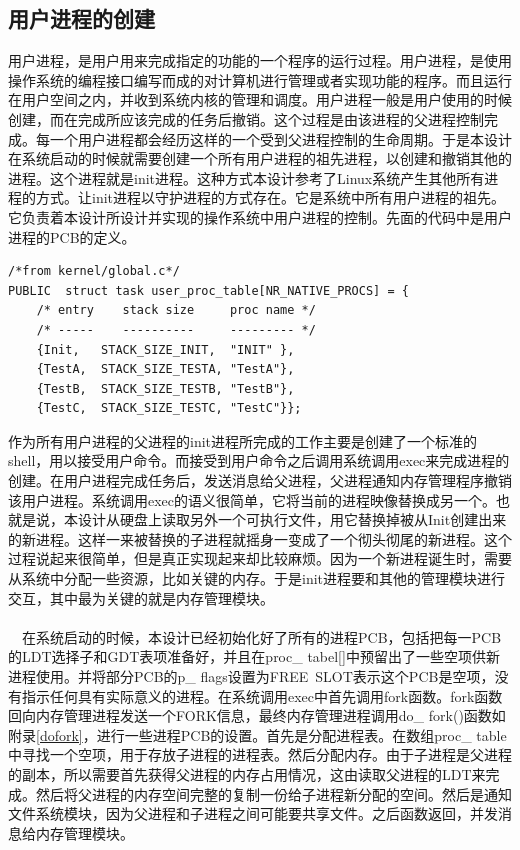 \documentclass[UTF8,nofonts,cs4size]{ctexrep}
\begin{document}
\subsection{用户进程的创建}
用户进程，是用户用来完成指定的功能的一个程序的运行过程。用户进程，是使用操作系统的编程接口编写而成的对计算机进行管理或者实现功能的程序。而且运行在用户空间之内，并收到系统内核的管理和调度。用户进程一般是用户使用的时候创建，而在完成所应该完成的任务后撤销。这个过程是由该进程的父进程控制完成。每一个用户进程都会经历这样的一个受到父进程控制的生命周期。于是本设计在系统启动的时候就需要创建一个所有用户进程的祖先进程，以创建和撤销其他的进程。这个进程就是init进程。这种方式本设计参考了Linux系统产生其他所有进程的方式。让init进程以守护进程的方式存在。它是系统中所有用户进程的祖先。它负责着本设计所设计并实现的操作系统中用户进程的控制。先面的代码中是用户进程的PCB的定义。
\begin{lstlisting}
/*from kernel/global.c*/
PUBLIC	struct task	user_proc_table[NR_NATIVE_PROCS] = {
	/* entry    stack size     proc name */
	/* -----    ----------     --------- */
	{Init,   STACK_SIZE_INIT,  "INIT" },
	{TestA,  STACK_SIZE_TESTA, "TestA"},
	{TestB,  STACK_SIZE_TESTB, "TestB"},
	{TestC,  STACK_SIZE_TESTC, "TestC"}};
\end{lstlisting}
作为所有用户进程的父进程的init进程所完成的工作主要是创建了一个标准的shell，用以接受用户命令。而接受到用户命令之后调用系统调用exec来完成进程的创建。在用户进程完成任务后，发送消息给父进程，父进程通知内存管理程序撤销该用户进程。系统调用exec的语义很简单，它将当前的进程映像替换成另一个。也就是说，本设计从硬盘上读取另外一个可执行文件，用它替换掉被从Init创建出来的新进程。这样一来被替换的子进程就摇身一变成了一个彻头彻尾的新进程。这个过程说起来很简单，但是真正实现起来却比较麻烦。因为一个新进程诞生时，需要从系统中分配一些资源，比如关键的内存。于是init进程要和其他的管理模块进行交互，其中最为关键的就是内存管理模块。
\paragraph{}
\indent \ \ 在系统启动的时候，本设计已经初始化好了所有的进程PCB，包括把每一PCB的LDT选择子和GDT表项准备好，并且在proc\_ tabel[]中预留出了一些空项供新进程使用。并将部分PCB的p\_ flags设置为FREE\ SLOT表示这个PCB是空项，没有指示任何具有实际意义的进程。在系统调用exec中首先调用fork函数。fork函数回向内存管理进程发送一个FORK信息，最终内存管理进程调用do\_ fork()函数如附录\ref{dofork}，进行一些进程PCB的设置。首先是分配进程表。在数组proc\_ table中寻找一个空项，用于存放子进程的进程表。然后分配内存。由于子进程是父进程的副本，所以需要首先获得父进程的内存占用情况，这由读取父进程的LDT来完成。然后将父进程的内存空间完整的复制一份给子进程新分配的空间。然后是通知文件系统模块，因为父进程和子进程之间可能要共享文件。之后函数返回，并发消息给内存管理模块。
\end{document}

